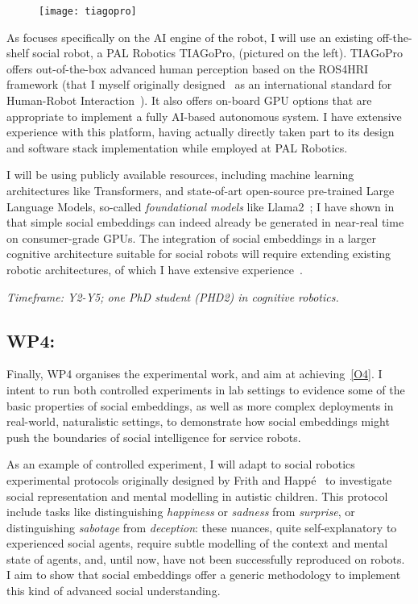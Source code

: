 \begin{figure}
    \centering
    \vspace{-10pt}
    \texttt{[image: tiagopro]}
    \label{fig:tiagopro}
\end{figure}

As \project focuses specifically on the AI engine of the robot, I will use an
existing off-the-shelf social robot, a PAL Robotics TIAGoPro,
(pictured on the left). TIAGoPro offers out-of-the-box advanced human perception
based on the ROS4HRI framework (that I myself originally
designed~\cite{mohamed2021ros4hri} as an international standard for Human-Robot
Interaction~\cite{lemaignan2022ros}). It also offers on-board GPU options that
are appropriate to implement a fully AI-based autonomous system. I have
extensive experience with this platform, having actually directly taken part to
its design and software stack implementation while employed at PAL Robotics.

I will be using publicly available resources, including machine
learning architectures like Transformers, and state-of-art open-source
pre-trained Large Language Models, so-called \emph{foundational models} like
Llama2~\cite{touvron2023llama}; I have shown in~\cite{lemaignan2024social} that
simple social embeddings can indeed already be generated in near-real time on
consumer-grade GPUs. The integration of social embeddings in a larger cognitive
architecture suitable for social robots will require extending existing
robotic architectures, of which I have extensive
experience~\cite{lemaignan2017artificial, lemaignan2015pyrobots,lemaignan2011what}.

\vspace{1em}
\noindent\emph{Timeframe: Y2-Y5; one PhD student (PHD2) in cognitive robotics.}

\subsection{WP4: \textbf{\WPD}}


Finally, WP4 organises the experimental work, and aim at achieving~\ref{O4}. I intent to run both controlled
experiments in lab settings to evidence some of the basic properties of social
embeddings, as well as more complex deployments in real-world, naturalistic
settings, to demonstrate how social embeddings might push the boundaries of
social intelligence for service robots.

As an example of controlled experiment, I will adapt to social
robotics~\cite{lemaignan2015mutual} experimental protocols originally designed
by Frith and Happé~\cite{frith1994autism} to investigate social representation
and mental modelling in autistic children. This protocol include tasks like
distinguishing \emph{happiness} or \emph{sadness} from \emph{surprise}, or
distinguishing \emph{sabotage} from \emph{deception}: these nuances, quite
self-explanatory to experienced social agents, require subtle modelling of the
context and mental state of agents, and, until now, have not been successfully
reproduced on robots. I aim to show that social embeddings offer a generic
methodology to implement this kind of advanced social understanding.

